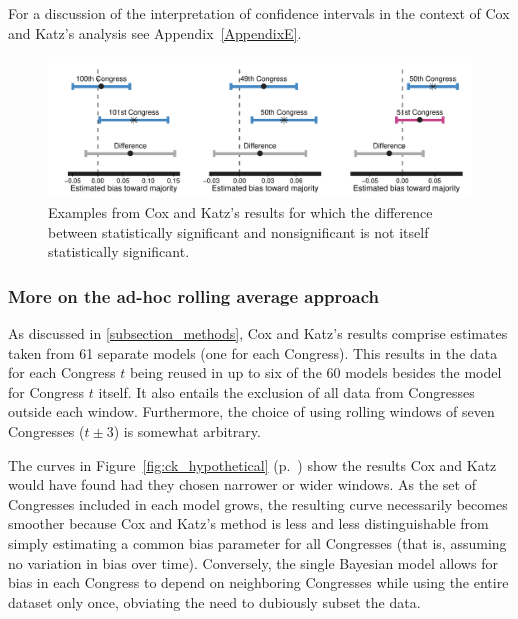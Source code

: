 For a discussion of the interpretation of confidence intervals in the context of Cox and Katz's analysis 
see Appendix~\ref{AppendixE}. 

\begin{figure}
\centering
\includegraphics[scale=0.75]{sections/figs/ck_signif_all}%
\caption{Examples from Cox and Katz's results for which the difference between statistically 
significant and nonsignificant is not itself statistically significant.}
\label{fig:ck_signif}
\end{figure}

\subsubsection{More on the ad-hoc rolling average approach}

As discussed in \ref{subsection_methods}, Cox and Katz's results comprise estimates taken 
from 61 separate models (one for each Congress). This results in the data for each Congress 
$t$ being reused in up to six of the 60 models besides the model for Congress $t$ itself. It also 
entails the exclusion of all data from Congresses outside each window. Furthermore, the 
choice of using rolling windows of seven Congresses ($t \pm 3$) is somewhat arbitrary. 

The curves in Figure~\ref{fig:ck_hypothetical} (p.~\pageref{fig:ck_hypothetical}) show the 
results Cox and Katz would have found had they chosen narrower or wider windows. As the 
set of Congresses included in each model grows, the resulting curve necessarily becomes 
smoother because Cox and Katz's method is less and less distinguishable from simply 
estimating a common bias parameter for all Congresses (that is, assuming no variation in 
bias over time). Conversely, the single Bayesian model allows for bias in each Congress to 
depend on neighboring Congresses while using the entire dataset only once, obviating the 
need to dubiously subset the data. 

